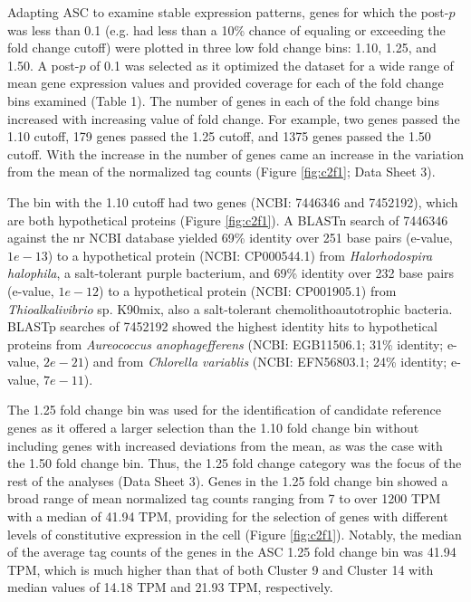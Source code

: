 Adapting ASC to examine stable expression patterns, genes for which the post-$p$ was less than 0.1 (e.g. had less than a 10\% chance of equaling or exceeding the fold change cutoff) were plotted in three low fold change bins: 1.10, 1.25, and 1.50. A post-$p$ of 0.1 was selected as it optimized the dataset for a wide range of mean gene expression values and provided coverage for each of the fold change bins examined (Table 1). The number of genes in each of the fold change bins increased with increasing value of fold change. For example, two genes passed the 1.10 cutoff, 179 genes passed the 1.25 cutoff, and 1375 genes passed the 1.50 cutoff. With the increase in the number of genes came an increase in the variation from the mean of the normalized tag counts (Figure \ref{fig:c2f1}; Data Sheet 3). \par
The bin with the 1.10 cutoff had two genes (NCBI: 7446346 and 7452192), which are both hypothetical proteins (Figure \ref{fig:c2f1}). A BLASTn search of 7446346 against the nr NCBI database yielded 69\% identity over 251 base pairs (e-value, $1e-13$) to a hypothetical protein (NCBI: CP000544.1) from \textit{Halorhodospira halophila}, a salt-tolerant purple bacterium, and 69\% identity over 232 base pairs (e-value, $1e-12$) to a hypothetical protein (NCBI: CP001905.1) from \textit{Thioalkalivibrio} sp. K90mix, also a salt-tolerant chemolithoautotrophic bacteria. BLASTp searches of 7452192 showed the highest identity hits to hypothetical proteins from \textit{Aureococcus anophagefferens} (NCBI: EGB11506.1; 31\% identity; e-value, $2e-21$) and from \textit{Chlorella variablis} (NCBI: EFN56803.1; 24\% identity; e-value, $7e-11$).\par 
The 1.25 fold change bin was used for the identification of candidate reference genes as it offered a larger selection than the 1.10 fold change bin without including genes with increased deviations from the mean, as was the case with the 1.50 fold change bin. Thus, the 1.25 fold change category was the focus of the rest of the analyses (Data Sheet 3). Genes in the 1.25 fold change bin showed a broad range of mean normalized tag counts ranging from 7 to over 1200 TPM with a median of 41.94 TPM, providing for the selection of genes with different levels of constitutive expression in the cell (Figure \ref{fig:c2f1}). Notably, the median of the average tag counts of the genes in the ASC 1.25 fold change bin was 41.94 TPM, which is much higher than that of both Cluster 9 and Cluster 14 with median values of 14.18 TPM and 21.93 TPM, respectively. \par
